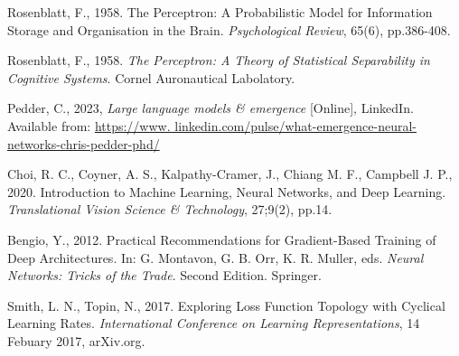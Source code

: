 \documentclass{article}
\begin{document}
\noindent
Rosenblatt, F., 1958. The Perceptron: A Probabilistic Model for Information Storage and Organisation in the Brain. \textit{Psychological Review}, 65(6), pp.386-408.

\noindent
Rosenblatt, F., 1958. \textit{The Perceptron: A Theory of Statistical Separability in Cognitive Systems}. Cornel Auronautical Labolatory.

\noindent
Pedder, C., 2023, \textit{Large language models \& emergence} [Online], LinkedIn. Available from: \href{https://www.linkedin.com/pulse/what-emergence-neural-networks-chris-pedder-phd/}{https://www.
linkedin.com/pulse/what-emergence-neural-networks-chris-pedder-phd/}

\noindent
Choi, R. C., Coyner, A. S., Kalpathy-Cramer, J., Chiang M. F., Campbell J. P., 2020. Introduction to Machine Learning, Neural Networks, and Deep Learning. \textit{Translational Vision Science \& Technology}, 27;9(2), pp.14.

\noindent
Bengio, Y., 2012. Practical Recommendations for Gradient-Based Training of Deep Architectures. In: G. Montavon, G. B. Orr, K. R. Muller, eds. \textit{Neural Networks: Tricks of the Trade}. Second Edition. Springer.

\noindent
Smith, L. N., Topin, N., 2017. Exploring Loss Function Topology with Cyclical Learning Rates. \textit{International Conference on Learning Representations}, 14 Febuary 2017, arXiv.org.




\end{document}
